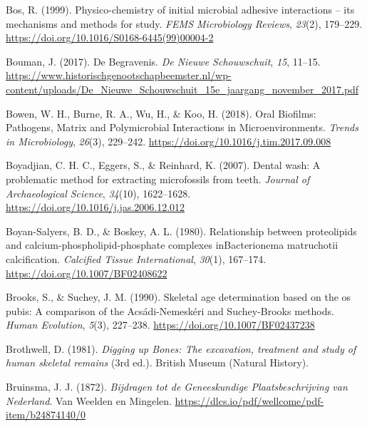 \documentclass[
  letterpaper,
]{book}
\newlength{\cslhangindent}
\newlength{\cslentryspacingunit} %
\newenvironment{CSLReferences}[2] %
 {%
  \setlength{\parindent}{0pt}
  \ifodd #1
  \let\oldpar\par
  \def\par{\hangindent=\cslhangindent\oldpar}
  \fi
  \setlength{\parskip}{#2\cslentryspacingunit}
 }%
 {}
\begin{document}
\begin{CSLReferences}{1}{0}
\leavevmode{}%
Bos, R. (1999). Physico-chemistry of initial microbial adhesive
interactions -- its mechanisms and methods for study. \emph{FEMS
Microbiology Reviews}, \emph{23}(2), 179--229.
\url{https://doi.org/10.1016/S0168-6445(99)00004-2}

\leavevmode{}%
Bouman, J. (2017). De Begravenis. \emph{De Nieuwe Schouwschuit},
\emph{15}, 11--15.
\url{https://www.historischgenootschapbeemster.nl/wp-content/uploads/De_Nieuwe_Schouwschuit_15e_jaargang_november_2017.pdf}

\leavevmode{}%
Bowen, W. H., Burne, R. A., Wu, H., \& Koo, H. (2018). Oral {Biofilms}:
{Pathogens}, {Matrix} and {Polymicrobial Interactions} in
{Microenvironments}. \emph{Trends in Microbiology}, \emph{26}(3),
229--242. \url{https://doi.org/10.1016/j.tim.2017.09.008}

\leavevmode{}%
Boyadjian, C. H. C., Eggers, S., \& Reinhard, K. (2007). Dental wash: A
problematic method for extracting microfossils from teeth. \emph{Journal
of Archaeological Science}, \emph{34}(10), 1622--1628.
\url{https://doi.org/10.1016/j.jas.2006.12.012}

\leavevmode{}%
Boyan-Salyers, B. D., \& Boskey, A. L. (1980). Relationship between
proteolipids and calcium-phospholipid-phosphate complexes
{inBacterionema} matruchotii calcification. \emph{Calcified Tissue
International}, \emph{30}(1), 167--174.
\url{https://doi.org/10.1007/BF02408622}

\leavevmode{}%
Brooks, S., \& Suchey, J. M. (1990). Skeletal age determination based on
the os pubis: {A} comparison of the {Acsádi-Nemeskéri} and
{Suchey-Brooks} methods. \emph{Human Evolution}, \emph{5}(3), 227--238.
\url{https://doi.org/10.1007/BF02437238}

\leavevmode{}%
Brothwell, D. (1981). \emph{Digging up {Bones}: {The} excavation,
treatment and study of human skeletal remains} (3rd ed.). {British
Museum (Natural History)}.

\leavevmode{}%
Bruinsma, J. J. (1872). \emph{Bijdragen tot de {Geneeskundige
Plaatsbeschrijving} van {Nederland}}. {Van Weelden en Mingelen}.
\url{https://dlcs.io/pdf/wellcome/pdf-item/b24874140/0}


\end{CSLReferences}
\end{document}
